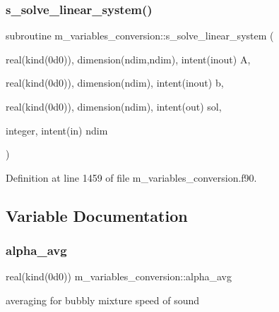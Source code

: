 \mbox{\label{namespacem__variables__conversion_afd3e70122b6f083342f644fdf5b18694}} 
\subsubsection{\texorpdfstring{s\+\_\+solve\+\_\+linear\+\_\+system()}{s\_solve\_linear\_system()}}
{\footnotesize\ttfamily subroutine m\+\_\+variables\+\_\+conversion\+::s\+\_\+solve\+\_\+linear\+\_\+system (\begin{DoxyParamCaption}\item[{real(kind(0d0)), dimension(ndim,ndim), intent(inout)}]{A,  }\item[{real(kind(0d0)), dimension(ndim), intent(inout)}]{b,  }\item[{real(kind(0d0)), dimension(ndim), intent(out)}]{sol,  }\item[{integer, intent(in)}]{ndim }\end{DoxyParamCaption})}



Definition at line 1459 of file m\+\_\+variables\+\_\+conversion.\+f90.



\subsection{Variable Documentation}
\mbox{\label{namespacem__variables__conversion_ac41b66d567256cb60746f95010a6ea65}} 
\subsubsection{\texorpdfstring{alpha\+\_\+avg}{alpha\_avg}}
{\footnotesize\ttfamily real(kind(0d0)) m\+\_\+variables\+\_\+conversion\+::alpha\+\_\+avg}



averaging for bubbly mixture speed of sound 



